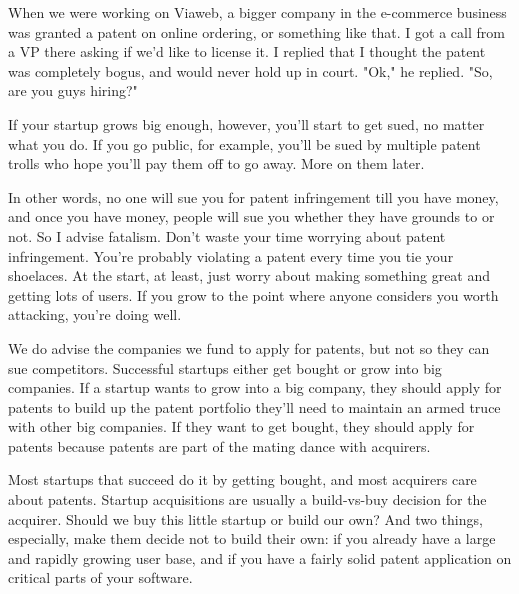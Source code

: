 When we were working on Viaweb, a bigger company
                  in the e-commerce business was granted a patent on online
                  ordering, or something like that. I got a call from a VP there
                  asking if we'd like to license it. I replied that I thought
                  the patent was completely bogus, and would never hold up in
                  court. "Ok," he replied. "So, are you guys hiring?"

If
                  your startup grows big enough, however, you'll start to get
                  sued, no matter what you do. If you go public, for example,
                  you'll be sued by multiple patent trolls who hope you'll pay
                  them off to go away. More on them later.

In other
                  words, no one will sue you for patent infringement till you
                  have money, and once you have money, people will sue you
                  whether they have grounds to or not. So I advise fatalism.
                  Don't waste your time worrying about patent infringement.
                  You're probably violating a patent every time you tie your
                  shoelaces. At the start, at least, just worry about making
                  something great and getting lots of users. If you grow to the
                  point where anyone considers you worth attacking, you're doing
                  well.

We do advise the companies we fund to apply
                  for patents, but not so they can sue competitors. Successful
                  startups either get bought or grow into big companies. If a
                  startup wants to grow into a big company, they should apply
                  for patents to build up the patent portfolio they'll need to
                  maintain an armed truce with other big companies. If they want
                  to get bought, they should apply for patents because patents
                  are part of the mating dance with acquirers.

Most
                  startups that succeed do it by getting bought, and most
                  acquirers care about patents. Startup acquisitions are usually
                  a build-vs-buy decision for the acquirer. Should we buy this
                  little startup or build our own? And two things, especially,
                  make them decide not to build their own: if you already have a
                  large and rapidly growing user base, and if you have a fairly
                  solid patent application on critical parts of your
                  software.

